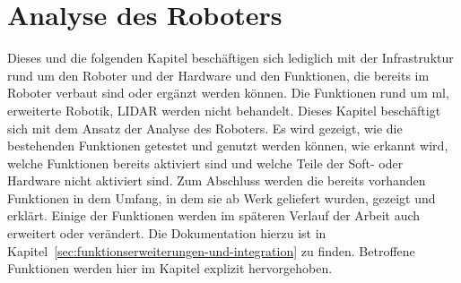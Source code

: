 \section{Analyse des Roboters}
\label{sec:analyse-des-roboters}
Dieses und die folgenden Kapitel beschäftigen sich lediglich mit der Infrastruktur rund um den Roboter
und der Hardware und den Funktionen, die bereits im Roboter verbaut sind oder ergänzt werden können.
Die Funktionen rund um \gls{ml}, erweiterte Robotik,  LIDAR werden nicht behandelt.
Dieses Kapitel beschäftigt sich mit dem Ansatz der Analyse des Roboters.
Es wird gezeigt, wie die bestehenden Funktionen getestet und genutzt werden können, wie erkannt wird,
welche Funktionen bereits aktiviert sind und welche Teile der Soft- oder Hardware nicht aktiviert sind.
Zum Abschluss werden die bereits vorhanden Funktionen in dem Umfang, in dem sie ab Werk geliefert wurden,
gezeigt und erklärt.
Einige der Funktionen werden im späteren Verlauf der Arbeit auch erweitert oder verändert.
Die Dokumentation hierzu ist in Kapitel~\ref{sec:funktionserweiterungen-und-integration} zu finden.
Betroffene Funktionen werden hier im Kapitel explizit hervorgehoben.












